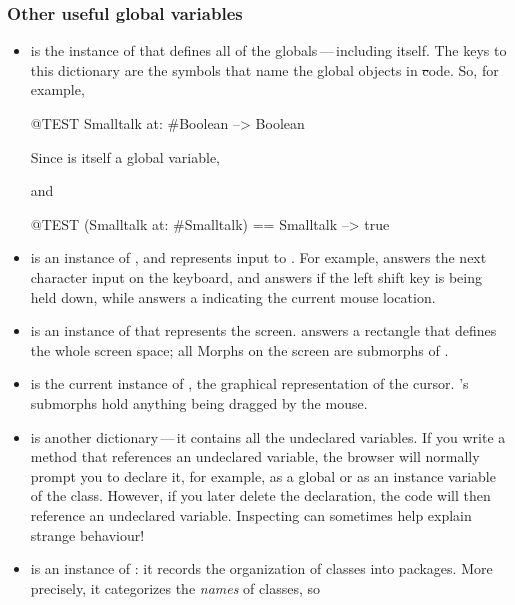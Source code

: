 \documentclass[a4paper,10pt,twoside]{book}
\begin{document}
\subsubsection{Other useful global variables}

\begin{itemize}
\item
{} is the instance of  that defines all of the globals\,---\,including  itself.   
The keys to this dictionary are the symbols that name the global objects in \st code.
So, for example,
\begin{code}{@TEST}
Smalltalk at: #Boolean --> Boolean
\end{code}
Since  is itself a global variable,
\begin{code}{}
Smalltalk at: #Smalltalk-->a SystemDictionary(lots of globals)}
\end{code} 
and
\begin{code}{@TEST}
(Smalltalk at: #Smalltalk) == Smalltalk --> true
\end{code}

\item {} is an instance of , and represents input to \pharo.
For example,  answers the next character input on the keyboard, and  answers  if the left shift key is being held down, while  answers a  indicating the current mouse location.

\item {} is an instance of  that represents the screen.
 answers a rectangle that defines the whole screen space; all Morphs on the screen are submorphs of .

\item 
{} is the current instance of , the graphical representation of the cursor.  's submorphs hold anything being dragged by the mouse.

\item
{} is another dictionary\,---\,it contains all the undeclared variables.
If you write a method that references an undeclared variable, the browser will normally
prompt you to declare it, for example, as a global or as an instance variable of the class.
However, if you later delete the declaration, the code will then reference an undeclared variable.
Inspecting  can sometimes help explain strange behaviour!

\item
{} is an instance of : it records the organization of classes into packages.  More precisely, it categorizes the \emph{names} of classes, so
\end{itemize}
\end{document}
